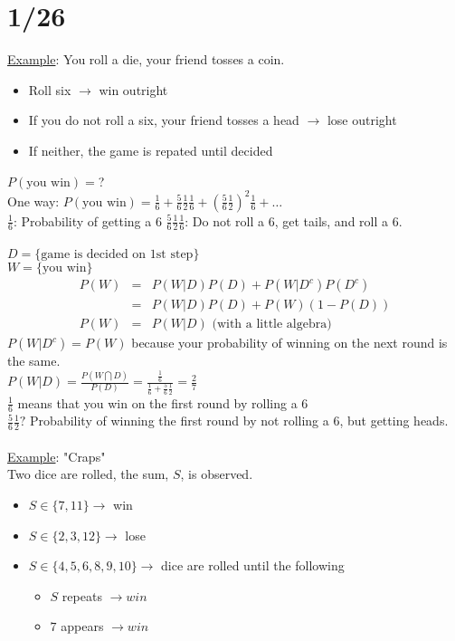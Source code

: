 \section*{1/26}
  \underline{Example}: You roll a die, your friend tosses a coin.
  \begin{itemize}
    \item Roll six $\to$ win outright
    \item If you do not roll a six, your friend tosses a head $\to$ lose 
      outright
    \item If neither, the game is repated until decided
  \end{itemize}
  $P(\text{you win}) = $?\\
  One way: $P(\text{you win}) = \frac{1}{6} + \frac{5}{6}\frac{1}{2} 
    \frac{1}{6} + (\frac{5}{6}\frac{1}{2})^2 \frac{1}{6} + \ldots$\\
  $\frac{1}{6}$: Probability of getting a 6
  $\frac{5}{6}\frac{1}{2}\frac{1}{6}$: Do not roll a 6, get tails,
    and roll a 6.\\\\
  $D = \{\text{game is decided on 1st step} \}$\\
  $W = \{\text{you win}\}$\\
  \begin{eqnarray*}
    P(W) & = & P(W  | D)P(D) + P(W | D^c)P(D^c)\\
    & = & P(W | D)P(D) + P(W)(1-P(D))\\ 
    P(W) & = & P(W | D) \text{ (with a little algebra)}
  \end{eqnarray*}
  $P(W | D^c) = P(W)$ because your probability of winning on the next round is
  the same.\\
  $P(W | D) = \frac{P(W \bigcap D)}{P(D)} = \frac{\frac{1}{6}}{\frac{1}{6} + 
    \frac{5}{6}\frac{1}{2}} = \frac{2}{7}$\\
  $\frac{1}{6}$ means that you win on the first round by rolling a 6\\
  $\frac{5}{6}\frac{1}{2}?$ Probability of winning the first round by
  not rolling a 6, but getting heads.\\\\
  \underline{Example}: "Craps"\\
    Two dice are rolled, the sum, $S$, is observed.\\
    \begin{itemize}
      \item $S \in \{7, 11 \} \to$ win
      \item $S \in \{2, 3, 12\} \to$ lose
      \item $S \in \{4, 5, 6, 8, 9, 10 \} \to$ dice are rolled until the 
        following
      \begin{itemize}
        \item $S$ repeats $\to win$
        \item $7$ appears $\to win$
      \end{itemize}
    \end{itemize}
